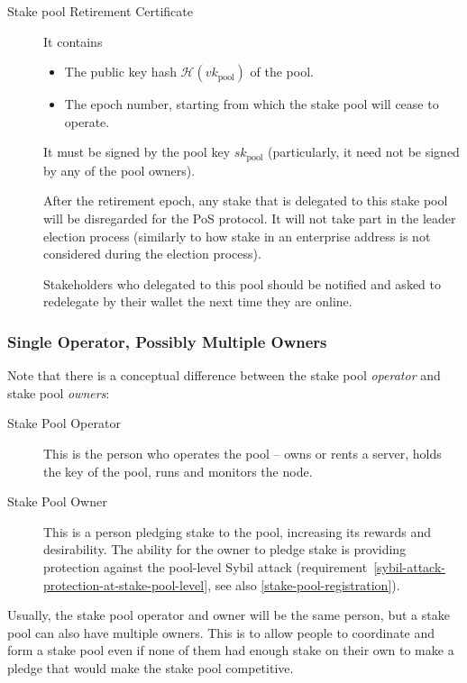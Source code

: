 \documentclass[11pt,a4paper]{article}
\begin{document}
\begin{description}
\item[Stake pool Retirement Certificate]
It contains

\begin{itemize}
\item
  The public key hash \(\mathcal{H}(vk_\text{pool})\) of the pool.
\item
  The epoch number, starting from which the stake pool will cease to
  operate.
\end{itemize}

It must be signed by the pool key \(sk_\text{pool}\) (particularly, it need not
be signed by any of the pool owners).

After the retirement epoch, any stake that is delegated to this stake
pool will be disregarded for the PoS protocol. It will not take part in
the leader election process (similarly to how stake in an enterprise
address is not considered during the election process).

Stakeholders who delegated to this pool should be notified and asked to
redelegate by their wallet the next time they are online.
\end{description}

\subsubsection{Single Operator, Possibly Multiple Owners}
\label{multiple-owners}

Note that there is a conceptual difference between the stake pool
\emph{operator} and stake pool \emph{owners}:
\begin{description}
\item[Stake Pool Operator] This is the person who operates the pool -- owns or
  rents a server, holds the key of the pool, runs and monitors the
  node.
\item[Stake Pool Owner] This is a person pledging stake
  to the pool, increasing its rewards and desirability. The ability
  for the owner to pledge stake is providing protection against the
  pool-level Sybil attack
  (requirement~\ref{sybil-attack-protection-at-stake-pool-level}, see
  also \cref{stake-pool-registration}).
\end{description}

Usually, the stake pool operator and owner will be the same person,
but a stake pool can also have multiple owners. This is to allow
people to coordinate and form a stake pool even if none of them had
enough stake on their own to make a pledge that would make the stake
pool competitive.
\end{document}
